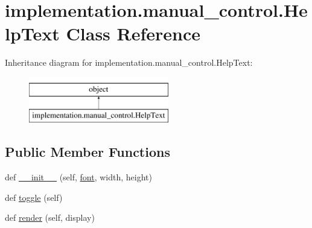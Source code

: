 \hypertarget{classimplementation_1_1manual__control_1_1_help_text}{}\section{implementation.\+manual\+\_\+control.\+Help\+Text Class Reference}
\label{classimplementation_1_1manual__control_1_1_help_text}
Inheritance diagram for implementation.\+manual\+\_\+control.\+Help\+Text\+:\begin{figure}[H]
\begin{center}
\leavevmode
\includegraphics[height=2.000000cm]{classimplementation_1_1manual__control_1_1_help_text}
\end{center}
\end{figure}
\subsection*{Public Member Functions}
\begin{DoxyCompactItemize}
\item 
def \hyperlink{classimplementation_1_1manual__control_1_1_help_text_a44a93d3a97a10f0bff24b87d9801df22}{\+\_\+\+\_\+init\+\_\+\+\_\+} (self, \hyperlink{classimplementation_1_1manual__control_1_1_help_text_af4a0194dd1d3b501def507f74fb34c66}{font}, width, height)
\item 
def \hyperlink{classimplementation_1_1manual__control_1_1_help_text_a6e4eebd3ea87100d4176bcfacd5d4dc3}{toggle} (self)
\item 
def \hyperlink{classimplementation_1_1manual__control_1_1_help_text_a85830f8209380e27dde8bdc6f31c2606}{render} (self, display)
\end{DoxyCompactItemize}
